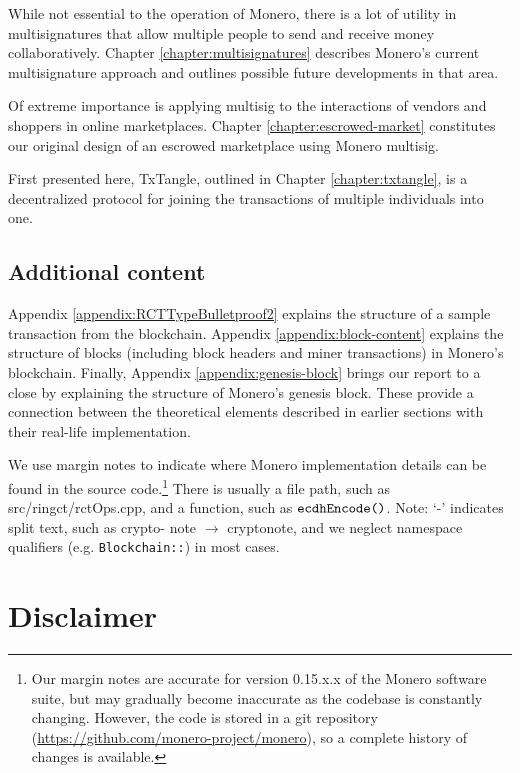 While not essential to the operation of Monero, there is a lot of utility in multisignatures that allow multiple people to send and receive money collaboratively. Chapter \ref{chapter:multisignatures} describes Monero's current multisignature approach and outlines possible future developments in that area.%

Of extreme importance is applying multisig to the interactions of vendors and shoppers in online marketplaces. Chapter \ref{chapter:escrowed-market} constitutes our original design of an escrowed marketplace using Monero multisig.

First presented here, TxTangle, outlined in Chapter \ref{chapter:txtangle}, is a decentralized protocol for joining the transactions of multiple individuals into one.


\subsection{Additional content}

Appendix \ref{appendix:RCTTypeBulletproof2} explains the structure of a sample transaction from the blockchain. Appendix \ref{appendix:block-content} explains the structure of blocks (including block headers and miner transactions) in Monero's blockchain. Finally, Appendix \ref{appendix:genesis-block} brings our report to a close by explaining the structure of Monero's genesis block. These provide a connection between the theoretical elements described in earlier sections with their real-life implementation.

We use margin notes to indicate where Monero implementation details can be found in the source code.\footnote{Our margin notes are accurate for version 0.15.x.x of the Monero software suite, but may gradually become inaccurate as the codebase is constantly changing. However, the code is stored in a git repository (\url{https://github.com/monero-project/monero}), so a complete history of changes is available.} There is usually a file path, such as src/ringct/rctOps.cpp, and a function, such as \(\textrm{{\tt ecdhEncode()}}\). Note: `-' indicates split text, such as crypto- note $\rightarrow$ cryptonote, and we neglect namespace qualifiers (e.g. {\tt Blockchain::}) in most cases.



\section{Disclaimer}

